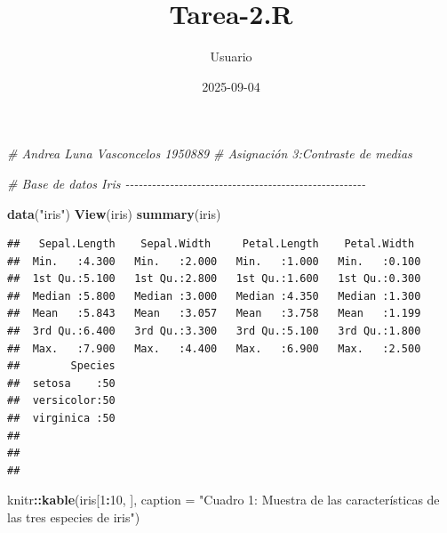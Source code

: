 \documentclass[
]{article}
\title{Tarea-2.R}
\author{Usuario}
\date{2025-09-04}
\newenvironment{Shaded}{\begin{snugshade}}{\end{snugshade}}
\newcommand{\AttributeTok}[1]{\textcolor[rgb]{0.13,0.29,0.53}{#1}}
\newcommand{\CommentTok}[1]{\textcolor[rgb]{0.56,0.35,0.01}{\textit{#1}}}
\newcommand{\DecValTok}[1]{\textcolor[rgb]{0.00,0.00,0.81}{#1}}
\newcommand{\FunctionTok}[1]{\textcolor[rgb]{0.13,0.29,0.53}{\textbf{#1}}}
\newcommand{\NormalTok}[1]{#1}
\newcommand{\SpecialCharTok}[1]{\textcolor[rgb]{0.81,0.36,0.00}{\textbf{#1}}}
\newcommand{\StringTok}[1]{\textcolor[rgb]{0.31,0.60,0.02}{#1}}
\begin{document}
\maketitle

\begin{Shaded}
\begin{Highlighting}[]
\CommentTok{\# Andrea Luna Vasconcelos 1950889}
\CommentTok{\# Asignación 3:Contraste de medias}


\CommentTok{\# Base de datos Iris {-}{-}{-}{-}{-}{-}{-}{-}{-}{-}{-}{-}{-}{-}{-}{-}{-}{-}{-}{-}{-}{-}{-}{-}{-}{-}{-}{-}{-}{-}{-}{-}{-}{-}{-}{-}{-}{-}{-}{-}{-}{-}{-}{-}{-}{-}{-}{-}{-}{-}{-}{-}{-}{-}}


\FunctionTok{data}\NormalTok{(}\StringTok{"iris"}\NormalTok{)}
\FunctionTok{View}\NormalTok{(iris)}
\FunctionTok{summary}\NormalTok{(iris)}
\end{Highlighting}
\end{Shaded}

\begin{verbatim}
##   Sepal.Length    Sepal.Width     Petal.Length    Petal.Width   
##  Min.   :4.300   Min.   :2.000   Min.   :1.000   Min.   :0.100  
##  1st Qu.:5.100   1st Qu.:2.800   1st Qu.:1.600   1st Qu.:0.300  
##  Median :5.800   Median :3.000   Median :4.350   Median :1.300  
##  Mean   :5.843   Mean   :3.057   Mean   :3.758   Mean   :1.199  
##  3rd Qu.:6.400   3rd Qu.:3.300   3rd Qu.:5.100   3rd Qu.:1.800  
##  Max.   :7.900   Max.   :4.400   Max.   :6.900   Max.   :2.500  
##        Species  
##  setosa    :50  
##  versicolor:50  
##  virginica :50  
##                 
##                 
## 
\end{verbatim}

\begin{Shaded}
\begin{Highlighting}[]
\NormalTok{knitr}\SpecialCharTok{::}\FunctionTok{kable}\NormalTok{(iris[}\DecValTok{1}\SpecialCharTok{:}\DecValTok{10}\NormalTok{, ], }\AttributeTok{caption =} \StringTok{"Cuadro 1: Muestra de las características}
\StringTok{de las tres especies de iris"}\NormalTok{)}
\end{Highlighting}
\end{Shaded}
\end{document}
